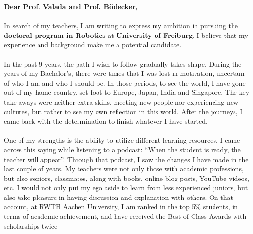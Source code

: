 \documentclass[
10pt, A4, english,
draft = false,
twoside = false,
]{article}
\begin{document}
	\onehalfspacing	
	{\fontsize{12}{0}\selectfont		
		\textbf{Dear Prof. Valada and Prof. Bödecker,}\\~\\
		In search of my teachers, I am writing to express my ambition in pursuing the \textbf{doctoral program in Robotics} at \textbf{University of Freiburg}. I believe that my experience and background make me a potential candidate.\\~\\
		In the past 9 years, the path I wish to follow gradually takes shape. During the years of my Bachelor's, there were times that I was lost in motivation, uncertain of who I am and who I should be. In those periods, to see the world, I have gone out of my home country, set foot to Europe, Japan, India and Singapore. The key take-aways were neither extra skills, meeting new people nor experiencing new cultures, but rather to see my own reflection in this world. After the journeys, I came back with the determination to finish whatever I have started.\\~\\		
		One of my strengths is the ability to utilize different learning resources. I came across this saying while listening to a podcast: “When the student is ready, the teacher will appear”. Through that podcast, I saw the changes I have made in the last couple of years. My teachers were not only those with academic professions, but also seniors, classmates, along with books, online blog posts, YouTube videos, etc. I would not only put my ego aside to learn from less experienced juniors, but also take pleasure in having discussion and explanation with others. On that account, at RWTH Aachen University, I am ranked in the top 5\% students, in terms of academic achievement, and have received the Best of Class Awards with scholarships twice.\\~\\		
}
\end{document}

